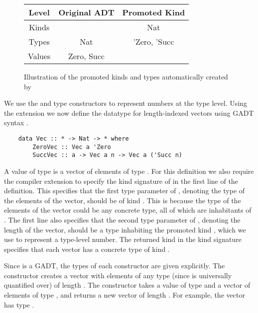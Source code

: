 \begin{figure}[h]
    \centering
    \begin{tabular}{ |c|c|c| } 
        \hline
        Level & Original ADT & Promoted Kind \\
        \hline 
        Kinds &  & Nat \\
        Types & Nat & 'Zero, 'Succ \\
        Values & Zero, Succ & \\
        \hline
    \end{tabular}
    \caption{Illustration of the promoted kinds and types automatically created by }
    \label{fig:datakindsPromotion}
\end{figure}


We use the  and  type constructors to represent numbers at the type level. Using the  extension we now define the datatype for length-indexed vectors using GADT syntax \cite{GADTs}.

\begin{lstlisting}
    data Vec :: * -> Nat -> * where
        ZeroVec :: Vec a 'Zero
        SuccVec :: a -> Vec a n -> Vec a ('Succ n)
\end{lstlisting}


A value of type  is a vector of  elements of type . For this definition we also require the  compiler extension to specify the kind signature of  in the first line of the definition. This specifies that the first type parameter of , denoting the type of the elements of the vector, should be of kind \code{*}. This is because the type of the elements of the vector could be any concrete type, all of which are inhabitants of \code{*}. The first line also specifies that the second type parameter of , denoting the length of the vector, should be a type inhabiting the promoted kind , which we use to represent a type-level number. The returned kind \code{*} in the kind signature specifies that each vector has a concrete type of kind \code{*}.

Since  is a GADT, the types of each constructor are given explicitly. The  constructor creates a vector with elements of any type (since  is universally quantified over) of length . The  constructor takes a value of type  and a vector of  elements of type , and returns a new vector of length . For example, the vector  has type .

